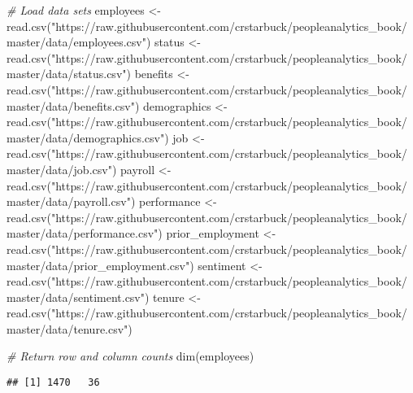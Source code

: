 \documentclass[
]{book}
\newenvironment{Shaded}{\begin{snugshade}}{\end{snugshade}}
\newcommand{\CommentTok}[1]{\textcolor[rgb]{0.56,0.35,0.01}{\textit{#1}}}
\newcommand{\FunctionTok}[1]{\textcolor[rgb]{0.00,0.00,0.00}{#1}}
\newcommand{\NormalTok}[1]{#1}
\newcommand{\OtherTok}[1]{\textcolor[rgb]{0.56,0.35,0.01}{#1}}
\newcommand{\StringTok}[1]{\textcolor[rgb]{0.31,0.60,0.02}{#1}}
\begin{document}
\begin{Shaded}
\begin{Highlighting}[]
\CommentTok{\# Load data sets}
\NormalTok{employees }\OtherTok{\textless{}{-}} \FunctionTok{read.csv}\NormalTok{(}\StringTok{"https://raw.githubusercontent.com/crstarbuck/peopleanalytics\_book/master/data/employees.csv"}\NormalTok{)}
\NormalTok{status }\OtherTok{\textless{}{-}} \FunctionTok{read.csv}\NormalTok{(}\StringTok{"https://raw.githubusercontent.com/crstarbuck/peopleanalytics\_book/master/data/status.csv"}\NormalTok{)}
\NormalTok{benefits }\OtherTok{\textless{}{-}} \FunctionTok{read.csv}\NormalTok{(}\StringTok{"https://raw.githubusercontent.com/crstarbuck/peopleanalytics\_book/master/data/benefits.csv"}\NormalTok{)}
\NormalTok{demographics }\OtherTok{\textless{}{-}} \FunctionTok{read.csv}\NormalTok{(}\StringTok{"https://raw.githubusercontent.com/crstarbuck/peopleanalytics\_book/master/data/demographics.csv"}\NormalTok{)}
\NormalTok{job }\OtherTok{\textless{}{-}} \FunctionTok{read.csv}\NormalTok{(}\StringTok{"https://raw.githubusercontent.com/crstarbuck/peopleanalytics\_book/master/data/job.csv"}\NormalTok{)}
\NormalTok{payroll }\OtherTok{\textless{}{-}} \FunctionTok{read.csv}\NormalTok{(}\StringTok{"https://raw.githubusercontent.com/crstarbuck/peopleanalytics\_book/master/data/payroll.csv"}\NormalTok{)}
\NormalTok{performance }\OtherTok{\textless{}{-}} \FunctionTok{read.csv}\NormalTok{(}\StringTok{"https://raw.githubusercontent.com/crstarbuck/peopleanalytics\_book/master/data/performance.csv"}\NormalTok{)}
\NormalTok{prior\_employment }\OtherTok{\textless{}{-}} \FunctionTok{read.csv}\NormalTok{(}\StringTok{"https://raw.githubusercontent.com/crstarbuck/peopleanalytics\_book/master/data/prior\_employment.csv"}\NormalTok{)}
\NormalTok{sentiment }\OtherTok{\textless{}{-}} \FunctionTok{read.csv}\NormalTok{(}\StringTok{"https://raw.githubusercontent.com/crstarbuck/peopleanalytics\_book/master/data/sentiment.csv"}\NormalTok{)}
\NormalTok{tenure }\OtherTok{\textless{}{-}} \FunctionTok{read.csv}\NormalTok{(}\StringTok{"https://raw.githubusercontent.com/crstarbuck/peopleanalytics\_book/master/data/tenure.csv"}\NormalTok{)}

\CommentTok{\# Return row and column counts}
\FunctionTok{dim}\NormalTok{(employees)}
\end{Highlighting}
\end{Shaded}

\begin{verbatim}
## [1] 1470   36
\end{verbatim}
\end{document}
